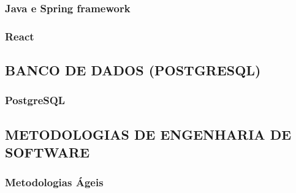         

        \subsubsection*{Java e Spring framework}

        \subsubsection*{React}

    \subsection{BANCO DE DADOS (POSTGRESQL)}

        \subsubsection*{PostgreSQL}

    \subsection{METODOLOGIAS DE ENGENHARIA DE SOFTWARE}

        \subsubsection*{Metodologias Ágeis}
        